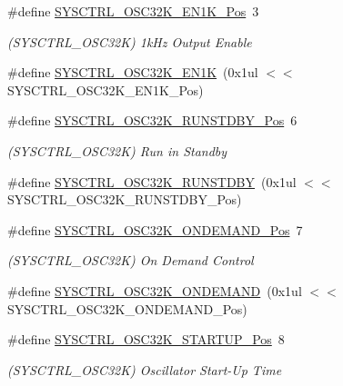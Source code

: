 \begin{DoxyCompactItemize}
\item 
\#define \mbox{\hyperlink{group___s_a_m_d21___s_y_s_c_t_r_l_gad0ac17e36e51e0ae957999394a12f66b}{S\+Y\+S\+C\+T\+R\+L\+\_\+\+O\+S\+C32\+K\+\_\+\+E\+N1\+K\+\_\+\+Pos}}~3
\begin{DoxyCompactList}\small\item\em (S\+Y\+S\+C\+T\+R\+L\+\_\+\+O\+S\+C32K) 1k\+Hz Output Enable \end{DoxyCompactList}\item 
\#define \mbox{\hyperlink{group___s_a_m_d21___s_y_s_c_t_r_l_gab0e4fad75952ad25d82a04e5c328c633}{S\+Y\+S\+C\+T\+R\+L\+\_\+\+O\+S\+C32\+K\+\_\+\+E\+N1K}}~(0x1ul $<$$<$ S\+Y\+S\+C\+T\+R\+L\+\_\+\+O\+S\+C32\+K\+\_\+\+E\+N1\+K\+\_\+\+Pos)
\item 
\#define \mbox{\hyperlink{group___s_a_m_d21___s_y_s_c_t_r_l_gac6169dcdd05bcc6e0229310b6dc8eb5b}{S\+Y\+S\+C\+T\+R\+L\+\_\+\+O\+S\+C32\+K\+\_\+\+R\+U\+N\+S\+T\+D\+B\+Y\+\_\+\+Pos}}~6
\begin{DoxyCompactList}\small\item\em (S\+Y\+S\+C\+T\+R\+L\+\_\+\+O\+S\+C32K) Run in Standby \end{DoxyCompactList}\item 
\#define \mbox{\hyperlink{group___s_a_m_d21___s_y_s_c_t_r_l_ga45bd8a5310d058dbdd2ece08c834e4dc}{S\+Y\+S\+C\+T\+R\+L\+\_\+\+O\+S\+C32\+K\+\_\+\+R\+U\+N\+S\+T\+D\+BY}}~(0x1ul $<$$<$ S\+Y\+S\+C\+T\+R\+L\+\_\+\+O\+S\+C32\+K\+\_\+\+R\+U\+N\+S\+T\+D\+B\+Y\+\_\+\+Pos)
\item 
\#define \mbox{\hyperlink{group___s_a_m_d21___s_y_s_c_t_r_l_ga05fb763fae47ceaa69a1c9e080b6c9ad}{S\+Y\+S\+C\+T\+R\+L\+\_\+\+O\+S\+C32\+K\+\_\+\+O\+N\+D\+E\+M\+A\+N\+D\+\_\+\+Pos}}~7
\begin{DoxyCompactList}\small\item\em (S\+Y\+S\+C\+T\+R\+L\+\_\+\+O\+S\+C32K) On Demand Control \end{DoxyCompactList}\item 
\#define \mbox{\hyperlink{group___s_a_m_d21___s_y_s_c_t_r_l_gae57597a100d90d9677f665a16c0f8784}{S\+Y\+S\+C\+T\+R\+L\+\_\+\+O\+S\+C32\+K\+\_\+\+O\+N\+D\+E\+M\+A\+ND}}~(0x1ul $<$$<$ S\+Y\+S\+C\+T\+R\+L\+\_\+\+O\+S\+C32\+K\+\_\+\+O\+N\+D\+E\+M\+A\+N\+D\+\_\+\+Pos)
\item 
\#define \mbox{\hyperlink{group___s_a_m_d21___s_y_s_c_t_r_l_gadafc09c0e3ed4c3d19d8969d733bd0a6}{S\+Y\+S\+C\+T\+R\+L\+\_\+\+O\+S\+C32\+K\+\_\+\+S\+T\+A\+R\+T\+U\+P\+\_\+\+Pos}}~8
\begin{DoxyCompactList}\small\item\em (S\+Y\+S\+C\+T\+R\+L\+\_\+\+O\+S\+C32K) Oscillator Start-\/\+Up Time \end{DoxyCompactList}\item 
$$
\end{DoxyCompactItemize}
